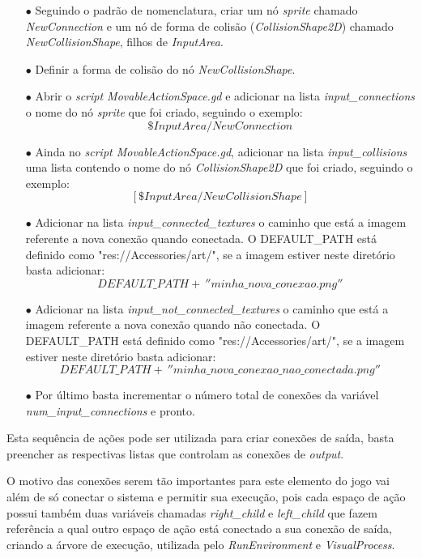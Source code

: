 \begin{itemize}
    \item[$\bullet$]
        Seguindo o padrão de nomenclatura, criar um nó \textit{sprite} chamado
        \textit{NewConnection} e um nó 
        de forma de colisão (\textit{CollisionShape2D}) chamado 
        \textit{NewCollisionShape}, filhos de \textit{InputArea}.
    \item[$\bullet$]
        Definir a forma de colisão do nó \textit{NewCollisionShape}.
    \item[$\bullet$]
        Abrir o \textit{script MovableActionSpace.gd} e adicionar na lista
        \textit{input\_connections} o nome do nó \textit{sprite} que foi criado,
        seguindo o exemplo:
        $$\$InputArea/NewConnection$$
    \item[$\bullet$]
        Ainda no \textit{script MovableActionSpace.gd}, adicionar na lista
        \textit{input\_collisions} uma lista contendo o nome do nó 
        \textit{CollisionShape2D} que foi criado, seguindo o exemplo: 
        $$[\$InputArea/NewCollisionShape]$$
    \item[$\bullet$]
        Adicionar na lista \textit{input\_connected\_textures} o caminho que
        está a imagem referente a nova conexão quando conectada.
        O DEFAULT\_PATH está definido como "res://Accessories/art/", se a imagem
        estiver neste diretório basta adicionar:
        $$DEFAULT\_PATH + \ ''minha\_nova\_conexao.png''$$
    \item[$\bullet$]
        Adicionar na lista \textit{input\_not\_connected\_textures} o caminho
        que está a imagem referente a nova conexão quando não conectada.
        O DEFAULT\_PATH está definido como "res://Accessories/art/", se a imagem
        estiver neste diretório basta adicionar:
        $$DEFAULT\_PATH + \ ''minha\_nova\_conexao\_nao\_conectada.png''$$
    \item[$\bullet$]
        Por último basta incrementar o número total de conexões da variável
        \textit{num\_input\_connections} e pronto.
\end{itemize}

Esta sequência de ações pode ser utilizada para criar conexões de saída,
basta preencher as respectivas listas que controlam as conexões de 
\textit{output}.

O motivo das conexões serem tão importantes para este elemento do jogo vai além
de só conectar o sistema e permitir sua execução, pois cada espaço de ação 
possui também duas variáveis chamadas \textit{right\_child} 
e \textit{left\_child} que fazem referência a qual outro espaço de ação está 
conectado a sua conexão de saída, criando a árvore de execução, utilizada
pelo \textit{RunEnvironment} e \textit{VisualProcess}.

